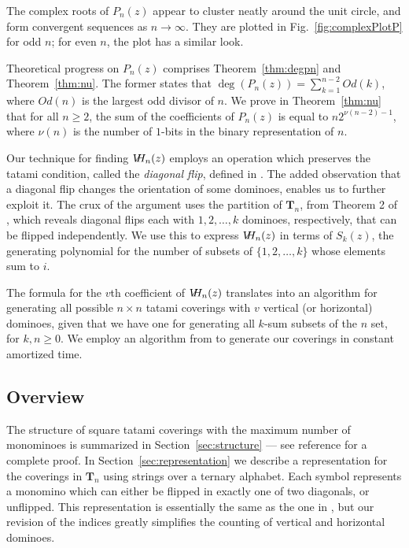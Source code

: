 \documentclass[12pt]{amsart}
\newcommand{\sref}[1]{Section~\ref{sec:#1}}
\newcommand{\tref}[1]{Theorem~\ref{thm:#1}}
\newcommand{\fref}[1]{Fig.~\ref{fig:#1}}
\newcommand{\Tn}[1]{\mathbf T_{#1}}
\newcommand{\vh}{V\hspace{-5pt}H}
\newcommand{\op}{Od}
\begin{document}
The complex roots of $P_n(z)$ appear to cluster neatly around the unit
circle, and form convergent sequences as $n\longrightarrow \infty$.
They are plotted in \fref{complexPlotP} for odd $n$; for even $n$, the
plot has a similar look.

Theoretical progress on $P_n(z)$ comprises \tref{degpn} and
\tref{nu}.  The former states that $\deg(P_n(z)) = \sum_{k=1}^{n-2}
\op(k)$, where $\op(n)$ is the largest odd divisor of $n$. We prove in
\tref{nu} that for all $n\ge 2$, the sum of the coefficients of
$P_n(z)$ is equal to $n2^{\nu(n-2)-1}$, where $\nu(n)$ is the number
of $1$-bits in the binary representation of $n$.

Our technique for finding $\vh_n(z)$ employs an operation which
preserves the tatami condition, called the \emph{diagonal flip},
defined in \cite{EricksonSchurch2012}.  The added observation that a
diagonal flip changes the orientation of some dominoes, enables us to
further exploit it.  The crux of the argument uses the partition of
$\Tn{n}$, from Theorem 2 of \cite{EricksonSchurch2012}, which reveals
diagonal flips each with $1,2,\ldots, k$ dominoes, respectively, that
can be flipped independently.  We use this to express $\vh_n(z)$ in
terms of $S_k(z)$, the generating polynomial for the number of subsets
of $\{1,2,\ldots,k\}$ whose elements sum to $i$.

The formula for the $v$th coefficient of $\vh_n(z)$ translates into an
algorithm for generating all possible $n\times n$ tatami coverings
with $v$ vertical (or horizontal) dominoes, given that we have one for
generating all $k$-sum subsets of the $n$ set, for $k,n\ge 0$.  We
employ an algorithm from \cite{BaronaigienRuskey1993} to generate our
coverings in constant amortized time.

\subsection{Overview}
The structure of square tatami coverings with the maximum number of
monominoes is summarized in \sref{structure} --- see reference
\cite{EricksonRuskeySchurch2011} for a complete proof.  In
\sref{representation} we describe a representation for the coverings
in $\Tn{n}$ using strings over a ternary alphabet.  Each symbol
represents a monomino which can either be flipped in exactly one of
two diagonals, or unflipped.  This representation is essentially the
same as the one in \cite{EricksonSchurch2012}, but our revision of the
indices greatly simplifies the counting of vertical and horizontal
dominoes.
\end{document}
